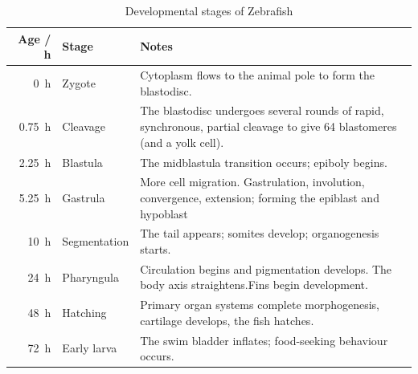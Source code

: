 \begin{table}
  \centering
  \begin{tabular*}{\textwidth}{rlp{23em}}
    \toprule
    Age / \SI{}{\hour}  & Stage & Notes \\
    \midrule
    \SI{0}{\hour} &  Zygote & Cytoplasm flows to the animal pole to form the blastodisc.\\
    \SI{0.75}{\hour} &  Cleavage & The blastodisc undergoes several rounds of rapid, synchronous, partial cleavage to give 64 blastomeres (and a yolk cell).\\
    \SI{2.25}{\hour} &  Blastula & The midblastula transition occurs; epiboly begins.\\
    \SI{5.25}{\hour} &  Gastrula & More cell migration. Gastrulation, involution, convergence, extension; forming the epiblast and hypoblast \\
    \SI{10}{\hour} & Segmentation & The tail appears; somites develop; organogenesis starts. \\
    \SI{24}{\hour} & Pharyngula &  Circulation begins and pigmentation develops. The body axis straightens.Fins begin development.\\
    \SI{48}{\hour} & Hatching & Primary organ systems complete morphogenesis, cartilage develops, the fish hatches.\\
    \SI{72}{\hour} & Early larva & The swim bladder inflates; food-seeking behaviour occurs. \\
        \bottomrule
  \end{tabular*}
  \caption{Developmental stages of Zebrafish}
  \label{tab:zfish_dev}
\end{table}


